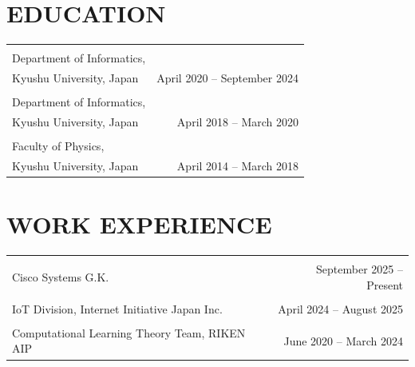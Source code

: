 \documentclass[10pt, letterpaper]{article}
\begin{document}
    \section{EDUCATION}
    \begin{tabularx}{\textwidth}{Xr}
        \begin{tabular}{l}
            {\bf \large Doctor of Information Science} \\
            Department of Informatics, \\
            Kyushu University, Japan
        \end{tabular}
        & April 2020 -- September 2024 \\
        \begin{tabular}{l}
            {\bf \large Master of Computer Science} \\
            Department of Informatics, \\
            Kyushu University, Japan
        \end{tabular}
        & April 2018 -- March 2020 \\
        \begin{tabular}{l}
            {\bf \large Bachelor of Science} \\
            Faculty of Physics, \\
            Kyushu University, Japan
        \end{tabular}
        & April 2014 -- March 2018 \\
    \end{tabularx}
    
    \section{WORK EXPERIENCE}
    \begin{tabularx}{\textwidth}{Xr}
        \begin{tabular}{l}
            {\bf \large Data Analyst} \\
            Cisco Systems G.K.
        \end{tabular}
        & September 2025 -- Present \\
        \begin{tabular}{l}
            {\bf \large System Engineer} \\
            IoT Division,
            Internet Initiative Japan Inc.
        \end{tabular}
        & April 2024 -- August 2025 \\
        \begin{tabular}{l}
            {\bf \large Part-time job} \\
            Computational Learning Theory Team,
            RIKEN AIP
        \end{tabular}
        & June 2020 -- March 2024 \\
    \end{tabularx}
\end{document}
